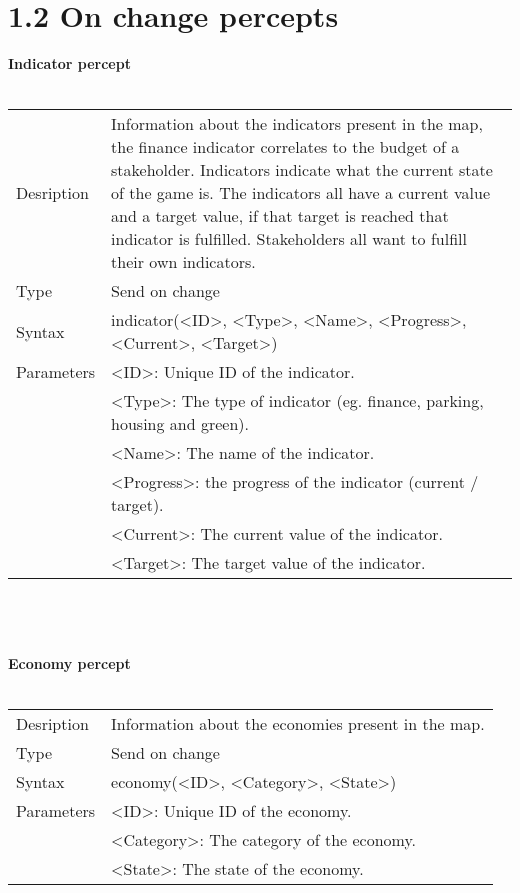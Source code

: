 \documentclass[english,11pt]{report}
\begin{document}
\newpage
\section*{1.2 On change percepts}

\textbf{Indicator percept}\\
\\
\begin{tabularx}{\textwidth}{lX}
 Desription & Information about the indicators present in the map, the finance indicator correlates to the budget of a stakeholder. Indicators indicate what the current state of the game is. The indicators all have a current value and a target value, if that target is reached that indicator is fulfilled. Stakeholders all want to fulfill their own indicators. \\
 Type & Send on change \\
 Syntax & indicator(<ID>, <Type>, <Name>, <Progress>, <Current>, <Target>) \\
 Parameters &   <ID>: Unique ID of the indicator.\\
            &   <Type>: The type of indicator (eg. finance, parking, housing and green).\\
            &   <Name>: The name of the indicator.\\
            &   <Progress>: the progress of the indicator (current / target).\\
            &   <Current>: The current value of the indicator.\\
            &   <Target>: The target value of the indicator.
\end{tabularx}\\
\\
\\
\textbf{Economy percept}\\
\\
\begin{tabularx}{\textwidth}{lX}
 Desription & Information about the economies present in the map. \\
 Type & Send on change \\
 Syntax & economy(<ID>, <Category>, <State>) \\
 Parameters &   <ID>: Unique ID of the economy.\\
            &   <Category>: The category of the economy.\\
            &   <State>: The state of the economy.
\end{tabularx}\\
\end{document}
